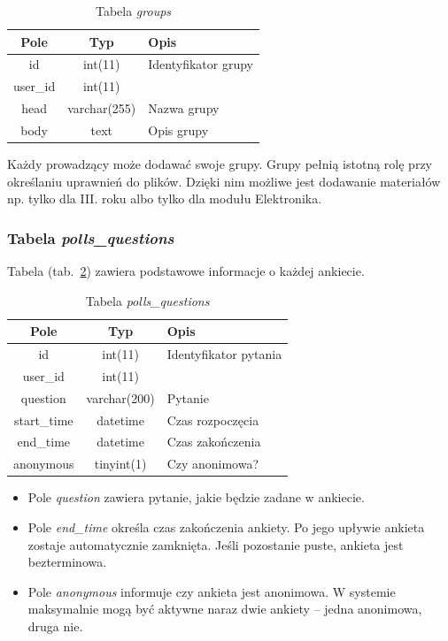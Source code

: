 \documentclass[a4paper,12pt,oneside]{report}
\begin{document}
\begin{table}[h]
  \centering
  \begin{tabular}{|c|c|l|}\hline
  Pole & Typ & Opis \\\hline
  id       & int(11)      & Identyfikator grupy\\
  user\_id & int(11)      & \\
  head     & varchar(255) & Nazwa grupy \\
  body     & text         & Opis grupy \\\hline
  \end{tabular}
  \caption{Tabela \emph{groups}\label{tab:groups}}
\end{table}
 Każdy prowadzący może dodawać swoje grupy. Grupy pełnią istotną rolę przy określaniu uprawnień do plików. Dzięki nim możliwe jest dodawanie materiałów np. tylko dla III. roku albo tylko dla modułu Elektronika.

\newpage
\subsubsection{Tabela \emph{polls\_questions}}
\label{subsub:polls_questions}
Tabela (tab.~\ref{tab:polls_questions}) zawiera podstawowe informacje o każdej ankiecie.

\begin{table}[h]
  \centering
  \begin{tabular}{|c|c|l|}\hline
  Pole & Typ & Opis \\\hline
  id          & int(11)      & Identyfikator pytania\\
  user\_id    & int(11)      & \\
  question    & varchar(200) & Pytanie \\
  start\_time & datetime     & Czas rozpoczęcia \\
  end\_time   & datetime     & Czas zakończenia \\
  anonymous   & tinyint(1)   & Czy anonimowa? \\\hline

  \end{tabular}
  \caption{Tabela \emph{polls\_questions}\label{tab:polls_questions}}
\end{table}
\begin{itemize}
  \item Pole \emph{question} zawiera pytanie, jakie będzie zadane w ankiecie.
  \item Pole \emph{end\_time} określa czas zakończenia ankiety. Po jego upływie ankieta zostaje automatycznie zamknięta. Jeśli pozostanie puste, ankieta jest bezterminowa.
  \item Pole \emph{anonymous} informuje czy ankieta jest anonimowa. W systemie maksymalnie mogą być aktywne naraz dwie ankiety -- jedna anonimowa, druga nie.
\end{itemize}
\end{document}
